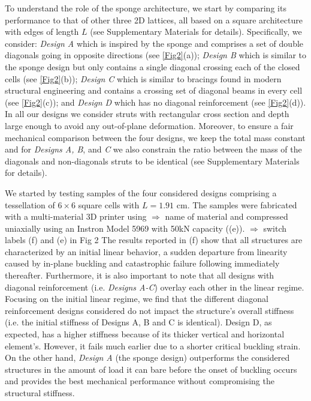 \documentclass[9pt,twocolumn,twoside]{fernandes_paper}
\newcommand{\KB}[1]{\noindent\color{blue}$\Longrightarrow$ #1\normalcolor}
\newcommand{\mf}[1]{\noindent\color{orange}{$\Longrightarrow$#1}\normalcolor}
\begin{document}
To understand  the role of the sponge architecture, we start by comparing its performance to that of other three 2D lattices, all based on a   square architecture with edges of length $L$ (see Supplementary Materials for details). Specifically,  we  consider:
\emph{Design A}  which is inspired by the sponge and comprises a set of double diagonals going in opposite directions (see \cref{Fig2}(a)); \emph{Design B}  which is similar to the sponge design but only contains a single diagonal crossing each of the closed cells (see \cref{Fig2}(b));   \emph{Design C}  which is similar to bracings found in modern structural engineering and contains a crossing set of diagonal beams in every cell (see \cref{Fig2}(c)); and \emph{Design D}  which  has no diagonal reinforcement (see \cref{Fig2}(d)). In all our designs we consider struts with rectangular cross section and depth large enough to avoid any out-of-plane deformation. Moreover, to ensure a fair mechanical comparison between the four designs, we keep the total mass constant and
for \emph{Designs A, B}, and \emph{C} we also constrain the  ratio between the mass of the diagonals and non-diagonals struts to be identical (see Supplementary Materials for details).  %

We started by testing samples of the four considered designs comprising a tessellation of $6\times6$ square cells with $L=1.91$ cm. The samples were fabricated with a multi-material 3D printer \mf{(add model @James)} using \KB{name of material} \mf{add info here @James} and compressed uniaxially  using  an Instron Model 5969 with 50kN capacity  ((e)). \KB{switch labels (f) and (e) in Fig 2} %
The results reported in (f)  show that all structures are characterized by an initial linear behavior, a sudden departure from linearity caused by in-plane buckling and catastrophic failure following immediately thereafter.   Furthermore, it is also important to note that all  designs with diagonal reinforcement (i.e. \emph{Designs A-C}) overlay each other in the linear regime. Focusing on the initial linear regime, we find that  the different diagonal reinforcement designs considered do not impact the structure's overall stiffness (i.e. the initial stiffness of Designs A, B and C is identical). Design D, as expected, has a higher stiffness because of its thicker vertical and horizontal element's. However, it fails much earlier due to a shorter critical buckling strain. On the other hand, \emph{Design A} (the sponge design) outperforms the  considered structures in the amount of load it can bare before the onset of buckling occurs and provides the best mechanical performance without compromising the structural stiffness.
\end{document}
